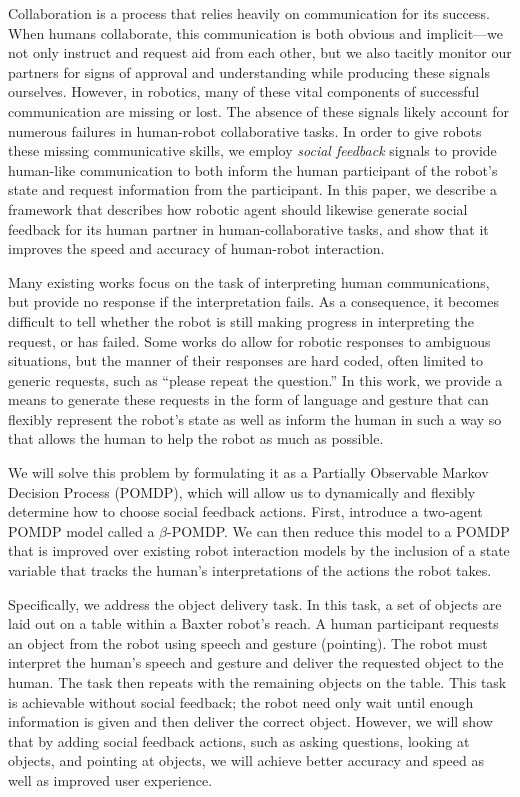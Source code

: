 \documentclass[conference]{IEEEtran}
\begin{document}
Collaboration is a process that relies heavily on communication for its success. When humans collaborate, this communication is both obvious and implicit---we not only instruct and request aid from each other, but we also tacitly monitor our partners for signs of approval and understanding while producing these signals ourselves. However, in robotics, many of these vital components of successful communication are missing or lost. The absence of these signals likely account for numerous failures in human-robot collaborative tasks. In order to give robots these missing communicative skills, we employ \emph{social feedback} signals to provide human-like communication to both inform the human participant of the robot's state and request information from the participant. In this paper, we describe a  framework that describes how robotic agent should likewise generate social feedback for its human partner in human-collaborative tasks, and show that it improves the speed and accuracy of human-robot interaction. 

Many existing works focus on the task of interpreting human communications\citep{tellex11,matuszek12,tellex12,misra14}, but provide no response if the interpretation fails. As a consequence, it becomes difficult to tell whether the robot is still making progress in interpreting the request, or has failed. Some works do allow for robotic responses to ambiguous situations, but the manner of their responses are hard coded, often limited to generic requests, such as ``please repeat the question.'' In this work, we provide a means to generate these requests in the form of language and gesture that can flexibly represent the robot's state as well as inform the human in such a way so that allows the human to help the robot as much as possible. 


We will solve this problem by formulating it as a Partially Observable Markov Decision Process (POMDP)\citep{kaelbling99}, which will allow us to dynamically and flexibly determine how to choose social feedback actions. First, introduce a two-agent POMDP model called a $\beta$-POMDP. We can then reduce this model to a POMDP that is improved over existing robot interaction models by the inclusion of a state variable that tracks the human's interpretations of the actions the robot takes. 

Specifically, we address the object delivery task. In this task, a set of objects are laid out on a table within a Baxter robot's reach. A human participant requests an object from the robot using speech and gesture (pointing). The robot must interpret the human's speech and gesture and deliver the requested object to the human. The task then repeats with the remaining objects on the table. This task is achievable without social feedback; the robot need only wait until enough information is given and then deliver the correct object. However, we will show that by adding social feedback actions, such as asking questions, looking at objects, and pointing at objects, we will achieve better accuracy and speed as well as improved user experience. 
\end{document}
